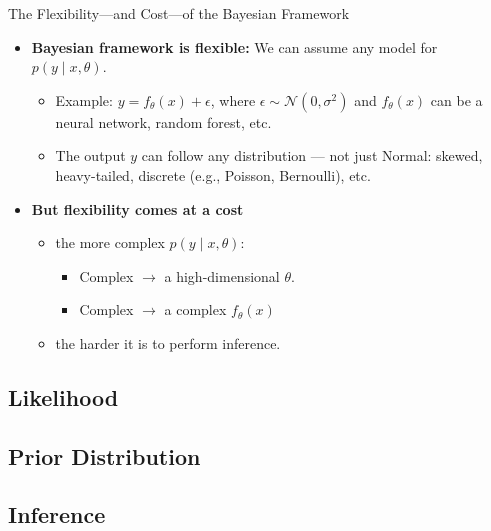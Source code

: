 \documentclass{beamer}
\begin{document}
\begin{frame}{The Flexibility—and Cost—of the Bayesian Framework}

\begin{itemize}
  \item \textbf{Bayesian framework is flexible:}
  We can assume any model for $p(y \mid x, \theta)$.
  \begin{itemize}
    \item Example: $y = f_\theta(x) + \epsilon$, where $\epsilon \sim \mathcal{N}(0, \sigma^2)$
    and $f_\theta(x)$ can be a neural network, random forest, etc.
    \item The output $y$ can follow any distribution — not just Normal:
    skewed, heavy-tailed, discrete (e.g., Poisson, Bernoulli), etc.
  \end{itemize}

\item \textbf{But flexibility comes at a cost}
  \begin{itemize}
    \item the more complex $p(y \mid x, \theta)$:
      \begin{itemize}
      \item Complex $\rightarrow$ a high-dimensional $\theta$.
      \item Complex $\rightarrow$ a complex $f_\theta(x)$
      \end{itemize}
    \item the harder it is to perform inference.
    \end{itemize}
  \end{itemize}

\end{frame}

\subsection{Likelihood}

\subsection{Prior Distribution}

\subsection{Inference}
\end{document}
